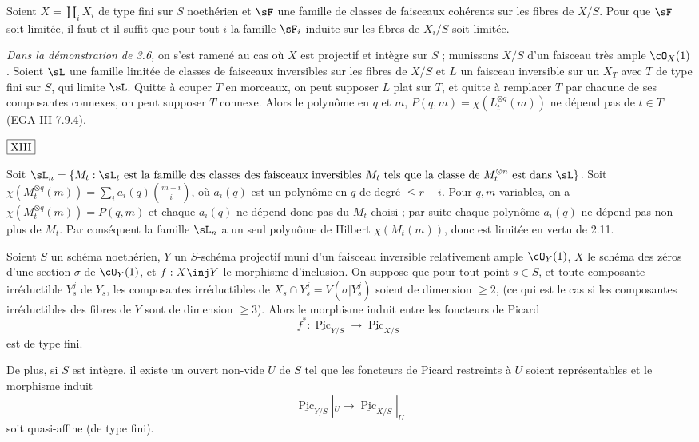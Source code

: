 \begin{lem}\label{lem:3.7} Soient $X = \coprod_i X_i$ de type fini sur $S$ noethérien et $\sF$ une famille de classes de faisceaux cohérents sur les fibres de $X/S$. Pour que $\sF$ soit limitée, il faut et il suffit que pour tout $i$ la famille $\sF_i$ induite sur les fibres de $X_i/S$ soit limitée.
\end{lem}

\noindent\textit{Dans la démonstration de 3.6,} on s'est ramené au cas où $X$ est projectif et intègre sur $S$ ; munissons $X/S$ d'un faisceau très ample $\cO_X(1)$. Soient $\sL$ une famille limitée de classes de faisceaux inversibles sur les fibres de $X/S$ et $L$ un faisceau inversible sur un $X_T$ avec $T$ de type fini sur $S$, qui limite $\sL$. Quitte à couper $T$ en morceaux, on peut supposer $L$ plat sur $T$, et quitte à remplacer $T$ par chacune de ses composantes connexes, on peut supposer $T$ connexe. Alors le polynôme en $q$ et $m$, $P(q,m) = \chi(L_t^{\otimes q}(m))$ ne dépend pas de $t \in T$ (EGA III 7.9.4).

\begin{flushright}
$\fbox{\text{XIII}}$
\end{flushright}

\noindent
Soit $\sL_n = \{M_t : \sL_t \text{ est la famille des classes des faisceaux inversibles } M_t \text{ tels que la classe de } M_t^{\otimes n} \text{ est dans } \sL\}$. Soit $\chi(M_t^{\otimes q}(m)) = \sum_i a_i(q) \binom{m+i}{i}$, où $a_i(q)$ est un polynôme en $q$ de degré $\leq r-i$. Pour $q, m$ variables, on a $\chi(M_t^{\otimes q}(m)) = P(q,m)$ et chaque $a_i(q)$ ne dépend donc pas du $M_t$ choisi ; par suite chaque polynôme $a_i(q)$ ne dépend pas non plus de $M_t$. Par conséquent la famille $\sL_n$ a un seul polynôme de Hilbert $\chi(M_t(m))$, donc est limitée en vertu de 2.11.

\begin{thm}\label{thm:3.8} Soient $S$ un schéma noethérien, $Y$ un $S$-schéma projectif muni d'un faisceau inversible relativement ample $\cO_Y(1)$, $X$ le schéma des zéros d'une section $\sigma$ de $\cO_Y(1)$, et $f : X \inj Y$ le morphisme d'inclusion. On suppose que pour tout point $s \in S$, et toute composante irréductible $Y_s^j$ de $Y_s$, les composantes irréductibles de $X_s \cap Y_s^j = V(\sigma|Y_s^j)$ soient de dimension $\geq 2$, (ce qui est le cas si les composantes irréductibles des fibres de $Y$ sont de dimension $\geq 3$). Alors le morphisme induit entre les foncteurs de Picard
\[
f^* : \underline{\operatorname{Pic}}_{Y/S} \to \underline{\operatorname{Pic}}_{X/S}
\]
est de type fini.

De plus, si $S$ est intègre, il existe un ouvert non-vide $U$ de $S$ tel que les foncteurs de Picard restreints à $U$ soient représentables et le morphisme induit
\[
\underline{\operatorname{Pic}}_{Y/S}|_U \to \underline{\operatorname{Pic}}_{X/S}|_U
\]
soit quasi-affine (de type fini).
\end{thm}

